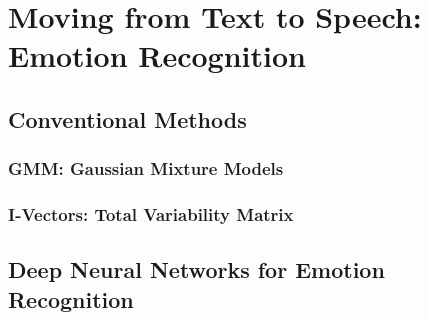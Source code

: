 \chapter{Moving from Text to Speech: Emotion Recognition}\label{chapter:emotionrecognition}

\section{Conventional Methods}
 	\subsection{GMM: Gaussian Mixture Models}
 	\subsection{I-Vectors: Total Variability Matrix}
 \section{Deep Neural Networks for Emotion Recognition}